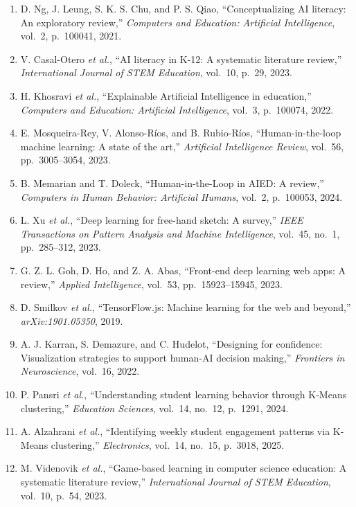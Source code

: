 \documentclass[10pt,twoside,openright]{report}
\begin{document}
\begin{enumerate}
    \item[{[1]}] D. Ng, J. Leung, S. K. S. Chu, and P. S. Qiao, ``Conceptualizing AI literacy: An exploratory review,'' \textit{Computers and Education: Artificial Intelligence}, vol.~2, p.~100041, 2021.
    \item[{[2]}] V. Casal-Otero \textit{et al.}, ``AI literacy in K-12: A systematic literature review,'' \textit{International Journal of STEM Education}, vol.~10, p.~29, 2023.
    \item[{[3]}] H. Khosravi \textit{et al.}, ``Explainable Artificial Intelligence in education,'' \textit{Computers and Education: Artificial Intelligence}, vol.~3, p.~100074, 2022.
    \item[{[4]}] E. Mosqueira-Rey, V. Alonso-Ríos, and B. Rubio-Ríos, ``Human-in-the-loop machine learning: A state of the art,'' \textit{Artificial Intelligence Review}, vol.~56, pp.~3005--3054, 2023.
    \item[{[5]}] B. Memarian and T. Doleck, ``Human-in-the-Loop in AIED: A review,'' \textit{Computers in Human Behavior: Artificial Humans}, vol.~2, p.~100053, 2024.
    \item[{[6]}] L. Xu \textit{et al.}, ``Deep learning for free-hand sketch: A survey,'' \textit{IEEE Transactions on Pattern Analysis and Machine Intelligence}, vol.~45, no.~1, pp.~285--312, 2023.
    \item[{[7]}] G. Z. L. Goh, D. Ho, and Z. A. Abas, ``Front-end deep learning web apps: A review,'' \textit{Applied Intelligence}, vol.~53, pp.~15923--15945, 2023.
    \item[{[8]}] D. Smilkov \textit{et al.}, ``TensorFlow.js: Machine learning for the web and beyond,'' \textit{arXiv:1901.05350}, 2019.
    \item[{[9]}] A. J. Karran, S. Demazure, and C. Hudelot, ``Designing for confidence: Visualization strategies to support human-AI decision making,'' \textit{Frontiers in Neuroscience}, vol.~16, 2022.
    \item[{[10]}] P. Pansri \textit{et al.}, ``Understanding student learning behavior through K-Means clustering,'' \textit{Education Sciences}, vol.~14, no.~12, p.~1291, 2024.
    \item[{[11]}] A. Alzahrani \textit{et al.}, ``Identifying weekly student engagement patterns via K-Means clustering,'' \textit{Electronics}, vol.~14, no.~15, p.~3018, 2025.
    \item[{[12]}] M. Videnovik \textit{et al.}, ``Game-based learning in computer science education: A systematic literature review,'' \textit{International Journal of STEM Education}, vol.~10, p.~54, 2023.

\end{enumerate}
\end{document}
